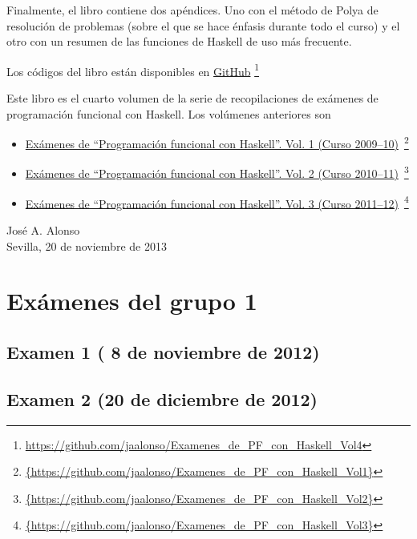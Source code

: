 \documentclass[a4paper,12pt,twoside]{book}
\begin{document}
Finalmente, el libro contiene dos apéndices. Uno con el método de Polya
de resolución de problemas (sobre el que se hace énfasis durante todo el
curso) y el otro con un resumen de las funciones de Haskell de uso más
frecuente.

Los códigos del libro están disponibles en
\href{https://github.com/jaalonso/Examenes_de_PF_con_Haskell_Vol3}
     {GitHub}
     \footnote{{\url{https://github.com/jaalonso/Examenes_de_PF_con_Haskell_Vol4}}}

Este libro es el cuarto volumen de la serie de recopilaciones de
exámenes de programación funcional con Haskell. Los volúmenes anteriores son
\begin{itemize}
\item
  \href{https://github.com/jaalonso/Examenes_de_PF_con_Haskell_Vol1}
  {Exámenes de ``Programaci\'on funcional con Haskell''.
    Vol. 1 (Curso 2009--10)}\
    \footnote{\url{{https://github.com/jaalonso/Examenes_de_PF_con_Haskell_Vol1}}}

\item
  \href{https://github.com/jaalonso/Examenes_de_PF_con_Haskell_Vol2}
  {Exámenes de ``Programaci\'on funcional con Haskell''.
    Vol. 2 (Curso 2010--11)}\
    \footnote{\url{{https://github.com/jaalonso/Examenes_de_PF_con_Haskell_Vol2}}}

\item
  \href{https://github.com/jaalonso/Examenes_de_PF_con_Haskell_Vol3}
  {Exámenes de ``Programaci\'on funcional con Haskell''.
    Vol. 3 (Curso 2011--12)}\
    \footnote{\url{{https://github.com/jaalonso/Examenes_de_PF_con_Haskell_Vol3}}}

\end{itemize}
     
\begin{flushright}
  José A. Alonso \\
  Sevilla, 20 de noviembre de 2013
\end{flushright}

\chapter{Exámenes del grupo 1}
\section{Examen 1 ( 8 de noviembre de 2012)}
\section{Examen 2 (20 de diciembre de 2012)}
\examen{Grupo_1/examen_2_20_dic.hs}
\end{document}
